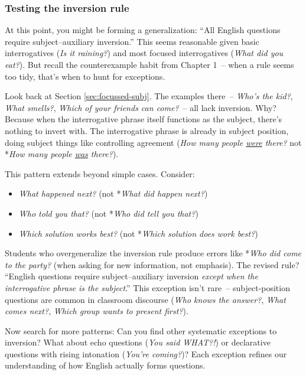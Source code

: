 \subsubsection*{Testing the inversion rule}

At this point, you might be forming a generalization: ``All English questions require subject--auxiliary inversion.'' This seems reasonable given basic interrogatives (\textit{Is it raining?}) and most focused interrogatives (\textit{What did you eat?}). But recall the counterexample habit from Chapter 1~-- when a rule seems too tidy, that's when to hunt for exceptions.

Look back at Section \ref{sec:focussed-subj}. The examples there~-- \textit{Who's the kid?}, \textit{What smells?}, \textit{Which of your friends can come?}~-- all lack inversion. Why? Because when the interrogative phrase itself functions as the subject, there's nothing to invert with. The interrogative phrase is already in subject position, doing subject things like controlling agreement (\textit{How many people \uline{were} there?} not *\textit{How many people \uline{was} there?}).

This pattern extends beyond simple cases. Consider:
\begin{itemize}[noitemsep]
   \item \textit{What happened next?} (not *\textit{What did happen next?})
   \item \textit{Who told you that?} (not *\textit{Who did tell you that?})
   \item \textit{Which solution works best?} (not *\textit{Which solution does work best?})
\end{itemize}

Students who overgeneralize the inversion rule produce errors like *\textit{Who did come to the party?} (when asking for new information, not emphasis). The revised rule? ``English questions require subject--auxiliary inversion \textit{except when the interrogative phrase is the subject}.'' This exception isn't rare~-- subject-position questions are common in classroom discourse (\textit{Who knows the answer?}, \textit{What comes next?}, \textit{Which group wants to present first?}).

Now search for more patterns: Can you find other systematic exceptions to inversion? What about echo questions (\textit{You said WHAT?!}) or declarative questions with rising intonation (\textit{You're coming?})? Each exception refines our understanding of how English actually forms questions.


